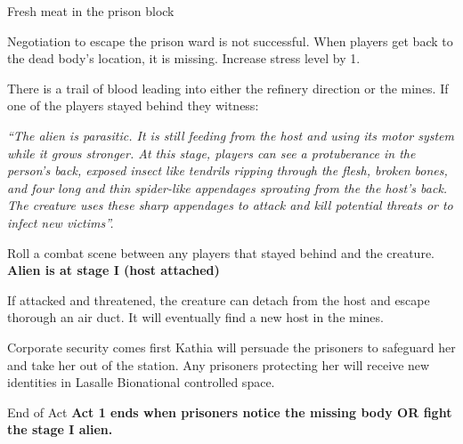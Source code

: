 \begin{rpg-commentbox}{Fresh meat in the prison block}
    
    Negotiation to escape the prison ward is not successful. When players get back to the dead body's location, it is missing. Increase stress level by 1.
    
    There is a trail of blood leading into either the refinery direction or the mines. If one of the players stayed behind they witness:
    
    \textit{
    ``The alien is parasitic. It is still feeding from the host and using its motor system while it grows stronger. At this stage, players can see a protuberance in the person's back, exposed insect like tendrils ripping through the flesh, broken bones, and four long and thin spider-like appendages sprouting from the the host's back. The creature uses these sharp appendages to attack and kill potential threats or to infect new victims''.
    } 

    \medskip
    
    
    Roll a combat scene between any players that stayed behind and the creature. \textbf{Alien is at stage I (host attached)}
    
    If attacked and threatened, the creature can detach from the host and escape thorough an air duct. It will eventually find a new host in the mines.
    
    

\end{rpg-commentbox}    


\begin{rpg-commentbox}{Corporate security comes first}
    Kathia will persuade the prisoners to safeguard her and take her out of the station. Any prisoners protecting her will receive new identities in Lasalle Bionational controlled space.
\end{rpg-commentbox}
    


\begin{rpg-commentbox}{End of Act}
    \textbf{Act 1 ends when prisoners notice the missing body OR fight the stage I alien.}
 \end{rpg-commentbox}
